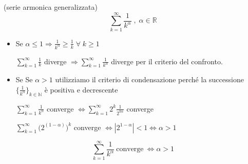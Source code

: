 \begin{exbar}
	\begin{example} (serie armonica generalizzata)
		$$\sum_{k=1}^\infty \frac{1}{k^\alpha} \; , \; \alpha\in\mathbb{R}$$
		
		\begin{itemize}
			\item  Se $\alpha\leq1 \Rightarrow \frac{1}{k^\alpha} \geq \frac{1}{k} \; \forall \; k\geq1$
			
			$\sum_{k=1}^\infty \frac{1}{k}$ diverge $\Rightarrow \sum_{k=1}^\infty \frac{1}{k^\alpha}$ diverge per il criterio del confronto.
			
			\item Se Se $\alpha > 1$ utilizziamo il criterio di condensazione perché la successione 		$\biggl\{\frac{1}{k^\alpha} \biggr\}_{k\in\mathbb{N}}$ è positiva e decrescente 
			
			$\sum_{k=1}^\infty \frac{1}{k^\alpha}$ converge $\iff \sum_{k=1}^\infty 2^k \frac{1}{2^{k\alpha}}$ converge
			
			$\sum_{k=1}^\infty \big(2^{(1-\alpha)} \big)^k$ converge $\iff |2^{1-\alpha}| < 1 \iff \alpha > 1$
		\end{itemize}
	\end{example}
\end{exbar}


\begin{attbar}
	\begin{equation*}
		\sum_{k=1}^\infty \frac{1}{k^\alpha} \ \text{converge}  \ \iff \alpha > 1
	\end{equation*}
\end{attbar}


